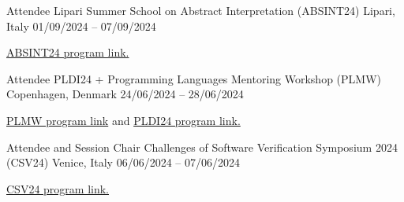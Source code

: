 \begin{cventries}
    \cventry
        {Attendee} %
        {Lipari Summer School on Abstract Interpretation (ABSINT24)} %
        {Lipari, Italy} %
        {01/09/2024 – 07/09/2024} %
        {
        \begin{cvitems} %
            \item {\href{https://drive.google.com/file/d/1uhLXjf0C\_OeptfQwxXwk\_3T8aFOkDMYC/view?pli=1}{ABSINT24 program link.}}
        \end{cvitems}
        }

    \cventry
        {Attendee} %
        {PLDI24 + Programming Languages Mentoring Workshop (PLMW)} %
        {Copenhagen, Denmark} %
        {24/06/2024 – 28/06/2024} %
        {
        \begin{cvitems} %
            \item {\href{https://pldi24.sigplan.org/track/PLMW-PLDI-2024\#program}{PLMW program link}
            and \href{https://pldi24.sigplan.org/program/program-pldi-2024/}{PLDI24 program link.}}
        \end{cvitems}
        }


    \cventry
        {Attendee and Session Chair} %
        {Challenges of Software Verification Symposium 2024 (CSV24)} %
        {Venice, Italy} %
        {06/06/2024 – 07/06/2024} %
        {
        \begin{cvitems} %
            \item {\href{https://unive-ssv.github.io/events/2024/06/06/csv.html}{CSV24 program link.}}
        \end{cvitems}
        }
\end{cventries}
